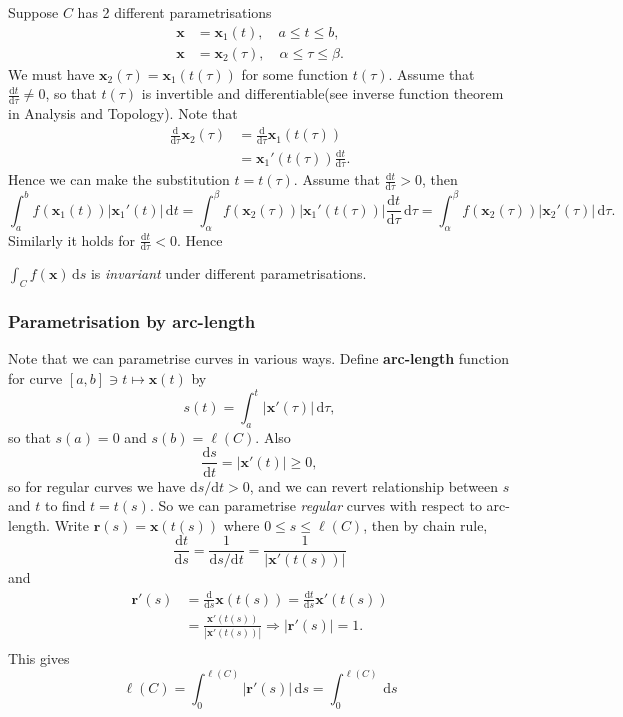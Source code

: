 Suppose $C$ has 2 different parametrisations
\begin{align*}
    \mathbf{x} &= \mathbf{x}_1(t), \quad a\le t\le b,\\
    \mathbf{x} &= \mathbf{x}_2(\tau),\quad \alpha\le \tau\le \beta.
\end{align*}
We must have $ \mathbf{x}_2(\tau) = \mathbf{x}_1(t(\tau)) $ for some function $t(\tau)$. Assume that $ \frac{\mathrm{d}t}{\mathrm{d}\tau}\neq 0  $, so that $ t(\tau) $ is invertible and differentiable(see inverse function theorem in Analysis and Topology). Note that 
\begin{align*}
    \frac{\mathrm{d}}{\mathrm{d}\tau} \mathbf{x}_2(\tau) &= \frac{\mathrm{d}}{\mathrm{d}\tau} \mathbf{x}_1(t(\tau))\\
    &= \mathbf{x}_1'(t(\tau)) \frac{\mathrm{d}t}{\mathrm{d}\tau}.  
\end{align*}
Hence we can make the substitution $ t=t(\tau) $. Assume that $ \frac{\mathrm{d}t}{\mathrm{d}\tau}>0  $, then 
\[
    \int_{a}^{b} f(\mathbf{x}_1(t)) |\mathbf{x}_1'(t)| \,\mathrm{d}t = \int_{\alpha}^{\beta} f(\mathbf{x}_2(\tau))|\mathbf{x}_1'(t(\tau))| \frac{\mathrm{d}t}{\mathrm{d}\tau}  \,\mathrm{d}\tau = \int_{\alpha}^{\beta} f(\mathbf{x}_2(\tau))|\mathbf{x}_2'(\tau)| \,\mathrm{d}\tau.
\]
Similarly it holds for $ \frac{\mathrm{d}t}{\mathrm{d}\tau}<0  $. Hence
\begin{proposition}\label{prop:change of parametrisations}
    $ \displaystyle \int_{C} f(\mathbf{x}) \,\mathrm{d}s $ is \textit{invariant} under different parametrisations.
\end{proposition}

\subsubsection*{Parametrisation by arc-length}
Note that we can parametrise curves in various ways. Define \textbf{arc-length} function for curve $ [a,b]\ni t \mapsto \mathbf{x}(t) $ by 
\[
    s(t) = \int_{a}^{t} \left| \mathbf{x}'(\tau) \right| \,\mathrm{d}\tau,
\]
so that $s(a)=0$ and $ s(b)=\ell (C) $. Also 
\[
    \frac{\mathrm{d}s}{\mathrm{d}t} = \left| \mathbf{x}'(t) \right| \ge 0, 
\]
so for regular curves we have $ \mathrm{d} s/\mathrm{d} t >0 $, and we can revert relationship between $s$ and $t$ to find $t=t(s)$. So we can parametrise \textit{regular} curves with respect to arc-length. Write $ \mathbf{r}(s)=\mathbf{x}(t(s)) $ where $ 0\le s\le \ell (C) $, then by chain rule, 
\[
    \frac{\mathrm{d}t}{\mathrm{d}s} = \frac{1}{\mathrm{d} s/\mathrm{d} t} = \frac{1}{\left| \mathbf{x}'(t(s)) \right| }
\]
and 
\begin{align*}
    \mathbf{r}'(s)&= \frac{\mathrm{d}}{\mathrm{d}s}\mathbf{x}(t(s))=\frac{\mathrm{d}t}{\mathrm{d}s}\mathbf{x}'(t(s))\\ 
    &= \frac{\mathbf{x}'(t(s))}{\left| \mathbf{x}'(t(s)) \right|} \Longrightarrow \left| \mathbf{r}'(s) \right| =1. \\ 
\end{align*}
This gives 
\[
    \ell (C) = \int_{0}^{\ell (C)} \left| \mathbf{r}'(s) \right| \,\mathrm{d}s = \int_{0}^{\ell (C)} \,\mathrm{d}s
\]


